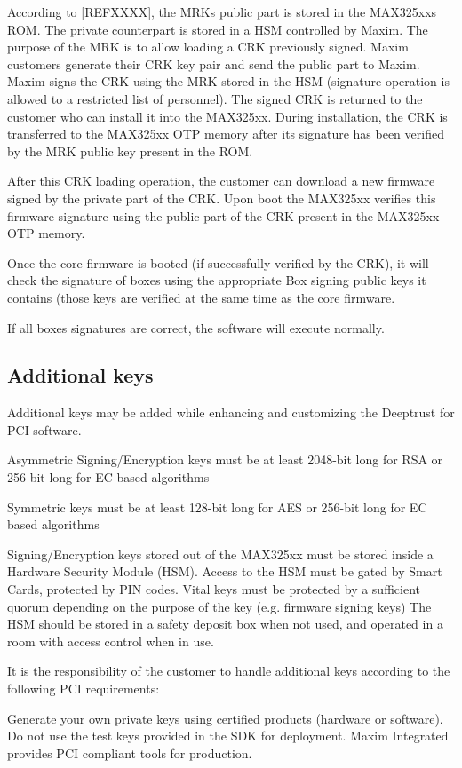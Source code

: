 According to \mbox{[}R\+E\+F\+X\+X\+XX\mbox{]}, the M\+RK\textquotesingle{}s public part is stored in the M\+A\+X325xx\textquotesingle{}s R\+OM. The private counterpart is stored in a H\+SM controlled by Maxim. The purpose of the M\+RK is to allow loading a C\+RK previously signed. Maxim customers generate their C\+RK key pair and send the public part to Maxim. Maxim signs the C\+RK using the M\+RK stored in the H\+SM (signature operation is allowed to a restricted list of personnel). The signed C\+RK is returned to the customer who can install it into the M\+A\+X325xx. During installation, the C\+RK is transferred to the M\+A\+X325xx O\+TP memory after its signature has been verified by the M\+RK public key present in the R\+OM.

After this C\+RK loading operation, the customer can download a new firmware signed by the private part of the C\+RK. Upon boot the M\+A\+X325xx verifies this firmware signature using the public part of the C\+RK present in the M\+A\+X325xx O\+TP memory.

Once the core firmware is booted (if successfully verified by the C\+RK), it will check the signature of boxes using the appropriate Box signing public keys it contains (those keys are verified at the same time as the core firmware.

If all boxes signatures are correct, the software will execute normally.\hypertarget{_p_c_i_g_u_i_d_a_n_c_e_sub_addkeys}{}\subsection{Additional keys}\label{_p_c_i_g_u_i_d_a_n_c_e_sub_addkeys}
Additional keys may be added while enhancing and customizing the Deeptrust for P\+CI software.


\begin{DoxyItemize}
\item Asymmetric Signing/\+Encryption keys must be at least 2048-\/bit long for R\+SA or 256-\/bit long for EC based algorithms
\item Symmetric keys must be at least 128-\/bit long for A\+ES or 256-\/bit long for EC based algorithms
\item Signing/\+Encryption keys stored out of the M\+A\+X325xx must be stored inside a Hardware Security Module (H\+SM). Access to the H\+SM must be gated by Smart Cards, protected by P\+IN codes. Vital keys must be protected by a sufficient quorum depending on the purpose of the key (e.\+g. firmware signing keys) The H\+SM should be stored in a safety deposit box when not used, and operated in a room with access control when in use.
\item It is the responsibility of the customer to handle additional keys according to the following P\+CI requirements\+:
\begin{DoxyItemize}
\item Generate your own private keys using certified products (hardware or software). Do not use the test keys provided in the S\+DK for deployment. Maxim Integrated provides P\+CI compliant tools for production.
\end{DoxyItemize}
\end{DoxyItemize}

